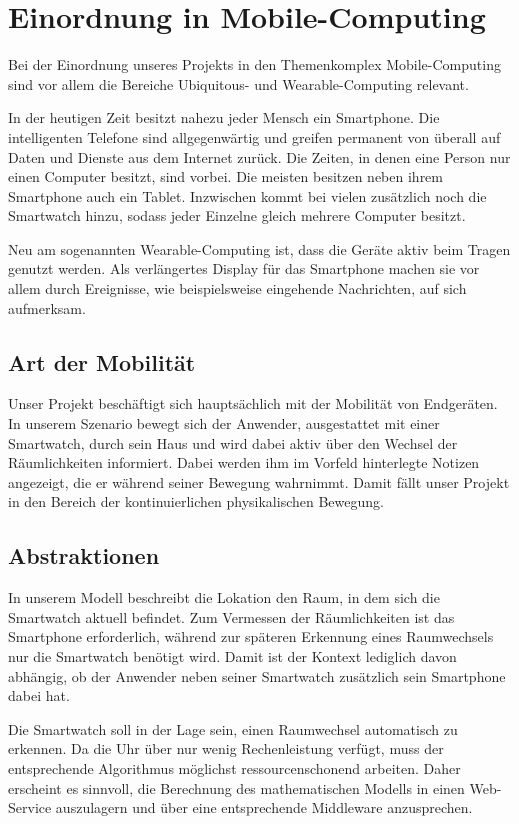 \section{Einordnung in Mobile-Computing}
Bei der Einordnung unseres Projekts in den Themenkomplex Mobile-Computing sind vor allem die Bereiche Ubiquitous- und Wearable-Computing relevant. 

In der heutigen Zeit besitzt nahezu jeder Mensch ein Smartphone. Die intelligenten Telefone sind allgegenwärtig und greifen permanent von überall auf Daten und Dienste aus dem Internet zurück. Die Zeiten, in denen eine Person nur einen Computer besitzt, sind vorbei. Die meisten besitzen neben ihrem Smartphone auch ein Tablet. Inzwischen kommt bei vielen zusätzlich noch die Smartwatch hinzu, sodass jeder Einzelne gleich mehrere Computer besitzt.

Neu am sogenannten Wearable-Computing ist, dass die Geräte aktiv beim Tragen genutzt werden. Als verlängertes Display für das Smartphone machen sie vor allem durch Ereignisse, wie beispielsweise eingehende Nachrichten, auf sich aufmerksam. 

\subsection{Art der Mobilität}
Unser Projekt beschäftigt sich hauptsächlich mit der Mobilität von Endgeräten. In unserem Szenario bewegt sich der Anwender, ausgestattet mit einer Smartwatch, durch sein Haus und wird dabei aktiv über den Wechsel der Räumlichkeiten informiert. Dabei werden ihm im Vorfeld hinterlegte Notizen angezeigt, die er während seiner Bewegung wahrnimmt. Damit fällt unser Projekt in den Bereich der kontinuierlichen physikalischen Bewegung.

\subsection{Abstraktionen}
In unserem Modell beschreibt die Lokation den Raum, in dem sich die Smartwatch aktuell befindet. Zum Vermessen der Räumlichkeiten ist das Smartphone erforderlich, während zur späteren Erkennung eines Raumwechsels nur die Smartwatch benötigt wird. Damit ist der Kontext lediglich davon abhängig, ob der Anwender neben seiner Smartwatch zusätzlich sein Smartphone dabei hat.

Die Smartwatch soll in der Lage sein, einen Raumwechsel automatisch zu erkennen. Da die Uhr über nur wenig Rechenleistung verfügt, muss der entsprechende Algorithmus möglichst ressourcenschonend arbeiten. Daher erscheint es sinnvoll, die Berechnung des mathematischen Modells in einen Web-Service auszulagern und über eine entsprechende Middleware anzusprechen.

